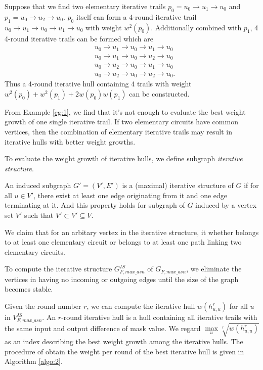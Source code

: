 \begin{example}\label{eg:1}
	Suppose that we find two elementary iterative trails $p_0=u_0\rightarrow u_1\rightarrow u_0$ and $p_1=u_0\rightarrow u_2 \rightarrow u_0$. $p_0$ itself can form a 4-round iterative trail $u_0\rightarrow u_1\rightarrow u_0\rightarrow u_1\rightarrow u_0$ with weight $w^2(p_0)$. Additionally combined with $p_1$, 4 4-round iterative trails can be formed which are
	\begin{align*}
		&u_0\rightarrow u_1\rightarrow u_0\rightarrow u_1\rightarrow u_0\\
		&u_0\rightarrow u_1\rightarrow u_0\rightarrow u_2\rightarrow u_0\\
		&u_0\rightarrow u_2\rightarrow u_0\rightarrow u_1\rightarrow u_0\\
		&u_0\rightarrow u_2\rightarrow u_0\rightarrow u_2\rightarrow u_0.
	\end{align*}
	Thus a 4-round iterative hull containing 4 trails with weight $w^2(p_0)+w^2(p_1)+2w(p_0)w(p_1)$ can be constructed.
\end{example}

From Example \ref{eg:1}, we find that it's not enough to evaluate the best weight growth of one single iterative trail. If two elementary circuits have common vertices, then the combination of elementary iterative trails may result in iterative hulls with better weight growths.  

To evaluate the weight growth of iterative hulls, we define subgraph \textit{iterative structure}. 

\begin{definition}
	An induced subgraph $G'=(V',E')$ is a (maximal) iterative structure of $G$ if for all $u\in V'$, there exist at least one edge originating from it and one edge terminating at it. And this property holds for subgraph of $G$ induced by a vertex set $\overline{V'}$ such that $V' \subset \overline{V'} \subseteq V$.
\end{definition}

We claim that for an arbitary vertex in the iterative structure, it whether belongs to at least one elementary circuit or belongs to at least one path linking two elementary circuits. 

To compute the iterative structure $G^{IS}_{F,max\_asn}$ of $G_{F,max\_asn}$, we eliminate the vertices in having no incoming or outgoing edges until the size of the graph becomes stable. 

Given the round number $r$, we can compute the iterative hull $w(h_{u,u}^r)$ for all $u$ in $V^{IS}_{F,max\_asn}$. An $r$-round iterative hull is a hull containing all iterative trails with the same input and output difference of mask value. We regard $\max\limits_{u}\sqrt[r]{w(h_{u,u}^r)}$ as an index describing the best weight growth among the iterative hulls. The procedure of obtain the weight per round of the best iterative hull is given in Algorithm \ref{algo:2}.


